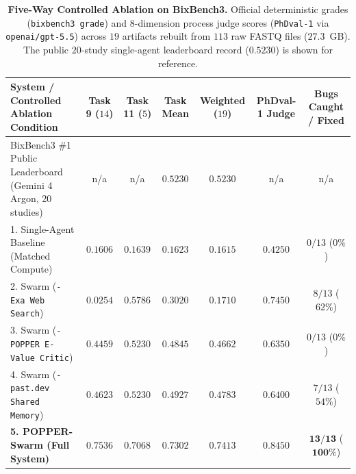 \documentclass[10pt,twocolumn]{article}
\begin{document}
\begin{table}[t]
\centering
\caption{\textbf{Five-Way Controlled Ablation on BixBench3.} Official deterministic grades (\texttt{bixbench3 grade}) and 8-dimension process judge scores (\texttt{PhDval-1} via \texttt{openai/gpt-5.5}) across $19$ artifacts rebuilt from $113$ raw FASTQ files ($27.3$~GB). The public $20$-study single-agent leaderboard record ($0.5230$) is shown for reference.}
\label{tab:ablation}
\vspace{4pt}
\small
\begin{tabular}{lcccccc}
\toprule
\textbf{System / Controlled Ablation Condition} & \textbf{Task 9 ($14$)} & \textbf{Task 11 ($5$)} & \textbf{Task Mean} & \textbf{Weighted ($19$)} & \textbf{PhDval-1 Judge} & \textbf{Bugs Caught / Fixed} \\
\midrule
BixBench3 \#1 Public Leaderboard (Gemini 4 Argon, 20 studies) & n/a & n/a & $0.5230$ & $0.5230$ & n/a & n/a \\
\midrule
1. Single-Agent Baseline (Matched Compute) & $0.1606$ & $0.1639$ & $0.1623$ & $0.1615$ & $0.4250$ & $0 / 13$ ($0\%$) \\
2. Swarm (\texttt{-Exa Web Search}) & $0.0254$ & $0.5786$ & $0.3020$ & $0.1710$ & $0.7450$ & $8 / 13$ ($62\%$) \\
3. Swarm (\texttt{-POPPER E-Value Critic}) & $0.4459$ & $0.5230$ & $0.4845$ & $0.4662$ & $0.6350$ & $0 / 13$ ($0\%$) \\
4. Swarm (\texttt{-past.dev Shared Memory}) & $0.4623$ & $0.5230$ & $0.4927$ & $0.4783$ & $0.6400$ & $7 / 13$ ($54\%$) \\
\midrule
\textbf{5. POPPER-Swarm (Full System)} & $\mathbf{0.7536}$ & $\mathbf{0.7068}$ & $\mathbf{0.7302}$ & $\mathbf{0.7413}$ & $\mathbf{0.8450}$ & $\mathbf{13 / 13}$ ($\mathbf{100\%}$) \\
\bottomrule
\end{tabular}
\end{table}
\end{document}
